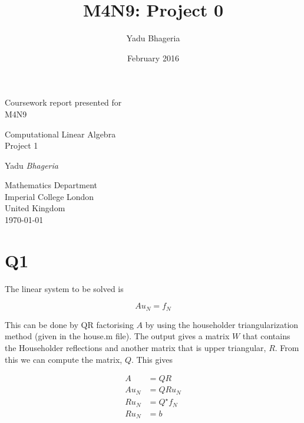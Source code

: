 \documentclass{article}
\title{M4N9: Project 0}
\author{Yadu Bhageria}
\date{February 2016}
\begin{document}
\begin{titlepage}
    \begin{center}
    
        Coursework report presented for\\
        M4N9
        
        \vfill
        
        {\Huge Computational Linear Algebra\\ Project 1}
        
        
        \vspace{0.5cm}
        
        \vspace{1.5cm}
        
        {\Large Yadu \emph{Bhageria}}
        
        \vfill
        
        Mathematics Department\\
        Imperial College London\\
        United Kingdom\\
        \today
        
    \end{center}
\end{titlepage}

\tableofcontents
\newpage

\section{Q1}

The linear system to be solved is

\[
	A u_N = f_N
\]

This can be done by QR factorising $A$ by using the householder triangularization method (given in the house.m file). The output gives a matrix $W$ that contains the Householder reflections and another matrix that is upper triangular, $R$. From this we can compute the matrix, $Q$. This gives

\begin{equation*}
\begin{split}
	A &= QR\\
	A u_N &= QR u_N \\
	R u_N &= Q^\star f_N \\
	R u_N &= b
\end{split}
\end{equation*}
\end{document}
